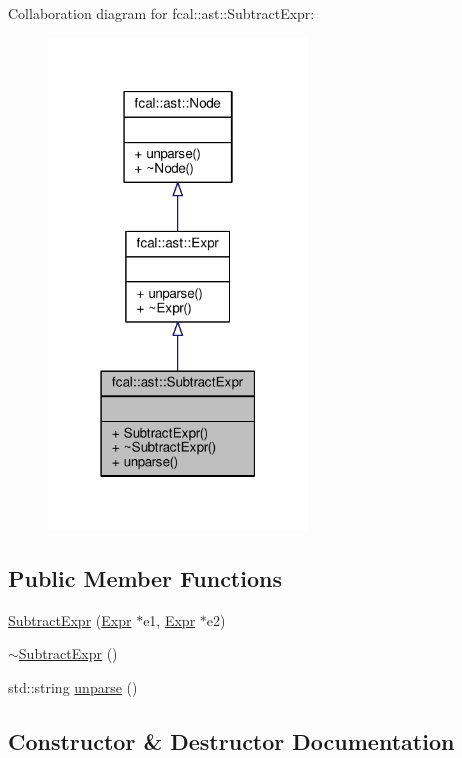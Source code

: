 Collaboration diagram for fcal\+:\+:ast\+:\+:Subtract\+Expr\+:
\nopagebreak
\begin{figure}[H]
\begin{center}
\leavevmode
\includegraphics[width=195pt]{classfcal_1_1ast_1_1SubtractExpr__coll__graph}
\end{center}
\end{figure}
\subsection*{Public Member Functions}
\begin{DoxyCompactItemize}
\item 
\hyperlink{classfcal_1_1ast_1_1SubtractExpr_abd1664992a38444cc6afafd070a8d515}{Subtract\+Expr} (\hyperlink{classfcal_1_1ast_1_1Expr}{Expr} $\ast$e1, \hyperlink{classfcal_1_1ast_1_1Expr}{Expr} $\ast$e2)
\item 
\hyperlink{classfcal_1_1ast_1_1SubtractExpr_a7dbb4833a90bb23fcfe2e71dc3af428d}{$\sim$\+Subtract\+Expr} ()
\item 
std\+::string \hyperlink{classfcal_1_1ast_1_1SubtractExpr_af9743e29d8e72ee1a33a55470cad923e}{unparse} ()
\end{DoxyCompactItemize}


\subsection{Constructor \& Destructor Documentation}
